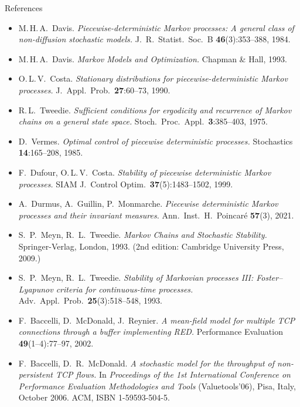 \documentclass[aspectratio=169]{beamer}
\begin{document}
\begin{frame}[allowframebreaks]{References}
  
  
  \begin{itemize}
    \item M.\,H.\,A.\ Davis.
          \textit{Piecewise-deterministic Markov processes: A general class of non-diffusion stochastic models.}
          J.\ R.\ Statist.\ Soc.\ B \textbf{46}(3):353--388, 1984.
    \item M.\,H.\,A.\ Davis.
          \textit{Markov Models and Optimization.}
          Chapman \& Hall, 1993.
    \item O.\,L.\,V.\ Costa.
          \textit{Stationary distributions for piecewise-deterministic Markov processes.}
          J.\ Appl.\ Prob.\ \textbf{27}:60--73, 1990.
    \item R.\,L.\ Tweedie.
          \textit{Sufficient conditions for ergodicity and recurrence of Markov chains on a general state space.}
          Stoch.\ Proc.\ Appl.\ \textbf{3}:385--403, 1975.
    \item D.\ Vermes.
          \textit{Optimal control of piecewise deterministic processes.}
          Stochastics \textbf{14}:165--208, 1985.
    \item F.\ Dufour, O.\,L.\,V.\ Costa.
          \textit{Stability of piecewise deterministic Markov processes.}
          SIAM J.\ Control Optim.\ \textbf{37}(5):1483--1502, 1999.
    \item A.\ Durmus, A.\ Guillin, P.\ Monmarche.
          \textit{Piecewise deterministic Markov processes and their invariant measures.}
          Ann.\ Inst.\ H.\ Poincar\'e \textbf{57}(3), 2021.
    \item S.~P.\ Meyn, R.~L.\ Tweedie.
      \textit{Markov Chains and Stochastic Stability.}
      Springer-Verlag, London, 1993.
      (2nd edition: Cambridge University Press, 2009.)
    \item S.~P.\ Meyn, R.~L.\ Tweedie.
      \textit{Stability of Markovian processes III: Foster--Lyapunov
      criteria for continuous-time processes.}
      Adv.\ Appl.\ Prob.\ \textbf{25}(3):518--548, 1993.

    \item F.~Baccelli, D.~McDonald, J.~Reynier.
      \textit{A mean-field model for multiple TCP connections through
      a buffer implementing RED.}
      Performance Evaluation \textbf{49}(1--4):77--97, 2002.

      \item F.~Baccelli, D.~R.~McDonald.
      \textit{A stochastic model for the throughput of
      non-persistent TCP flows.}
      In \textit{Proceedings of the 1st International Conference
      on Performance Evaluation Methodologies and Tools}
      (Valuetools'06), Pisa, Italy, October 2006.
      ACM, ISBN 1-59593-504-5.
  \end{itemize}
  
\end{frame}
\end{document}
